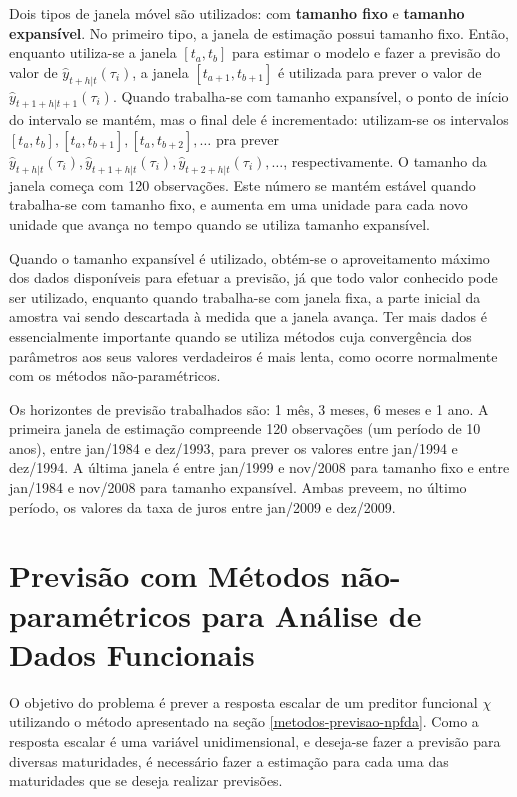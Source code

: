 \documentclass[
	12pt,				%
	openright,			%
	oneside,			%
	a4paper,			%
	english,			%
	brazil				%
	]{dissertacao-ufrgs-abntex2}
\begin{document}
Dois tipos de janela móvel são utilizados: com \textbf{tamanho fixo} e \textbf{tamanho expansível}. 
No primeiro tipo, a janela de estimação possui tamanho fixo. Então, enquanto utiliza-se a janela $[t_a,t_b]$ para estimar o modelo e fazer a previsão do valor de $\hat{y}_{t+h|t}(\tau_i)$, a janela $[t_{a+1},t_{b+1}]$ é utilizada para prever o valor de $\hat{y}_{t+1+h|t+1}(\tau_i)$. Quando trabalha-se com tamanho expansível, o ponto de início do intervalo se mantém, mas o final dele é incrementado: utilizam-se os intervalos $[t_{a},t_{b}] ,[t_{a},t_{b+1}],[t_{a},t_{b+2}],\dots$  pra prever $\hat{y}_{t+h|t}(\tau_i),\hat{y}_{t+1+h|t}(\tau_i),\hat{y}_{t+2+h|t}(\tau_i),\dots$, respectivamente. O tamanho da janela começa com 120 observações. Este número se mantém estável quando trabalha-se com tamanho fixo, e aumenta em uma unidade para cada novo unidade que avança no tempo quando se utiliza tamanho expansível.

Quando o tamanho expansível é utilizado, obtém-se o aproveitamento máximo dos dados disponíveis para efetuar a previsão, já que todo valor conhecido pode ser utilizado, enquanto quando trabalha-se com janela fixa, a parte inicial da amostra vai sendo descartada à medida que a janela avança. Ter mais dados é essencialmente importante quando se utiliza métodos cuja convergência dos parâmetros aos seus valores verdadeiros é mais lenta, como ocorre normalmente com os métodos não-paramétricos. 

Os horizontes de previsão trabalhados são: 1 mês, 3 meses, 6 meses e 1 ano.
A primeira janela de estimação compreende 120 observações (um período de 10 anos), entre jan/1984 e dez/1993, para prever os valores entre jan/1994 e dez/1994. A última janela é entre jan/1999 e nov/2008 para tamanho fixo e entre jan/1984 e nov/2008 para tamanho expansível. Ambas preveem, no último período, os valores da taxa de juros entre jan/2009 e dez/2009.

\section{Previsão com Métodos não-paramétricos para Análise de Dados Funcionais} \label{metodologia-npfda}

O objetivo do problema é prever a resposta escalar de um preditor funcional $\chi$ utilizando o método apresentado na seção \ref{metodos-previsao-npfda}. Como a resposta escalar é uma variável unidimensional, e deseja-se fazer a previsão para diversas maturidades, é necessário fazer a estimação para cada uma das maturidades que se deseja realizar previsões.
\end{document}
